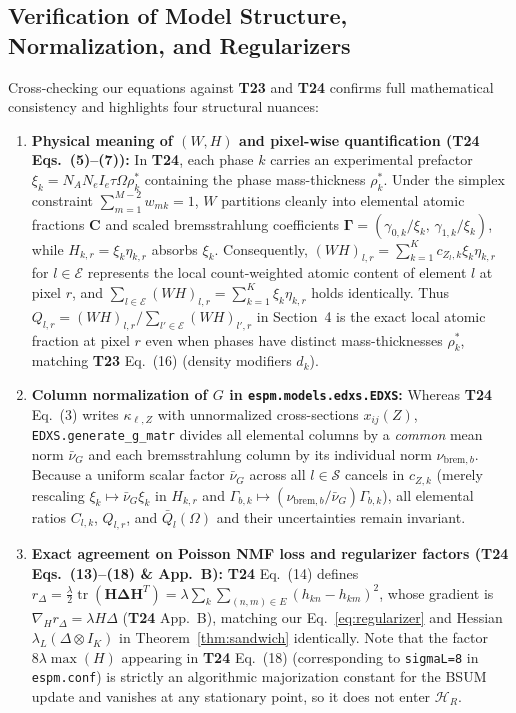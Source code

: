 \documentclass[11pt,a4paper]{article}
\theoremstyle{plain}
\theoremstyle{definition}
\theoremstyle{remark}
\newcommand{\E}{\mathcal{E}}
\newcommand{\cS}{\mathcal{S}}
\newcommand{\cH}{\mathcal{H}}
\newcommand{\tr}{\operatorname{tr}}
\newcommand{\kron}{\otimes}
\begin{document}
\subsection{Verification of Model Structure, Normalization, and Regularizers}
Cross-checking our equations against \textbf{T23} and \textbf{T24} confirms full mathematical consistency and highlights four structural nuances:
\begin{enumerate}[leftmargin=1.5em]
    \item \textbf{Physical meaning of $(W,H)$ and pixel-wise quantification (\textbf{T24} Eqs.~(5)--(7)):} In \textbf{T24}, each phase $k$ carries an experimental prefactor $\xi_k = N_A N_e I_e \tau \Omega \rho_k^*$ containing the phase mass-thickness $\rho_k^*$. Under the simplex constraint $\sum_{m=1}^{M-2} w_{mk} = 1$, $W$ partitions cleanly into elemental atomic fractions $\boldsymbol{C}$ and scaled bremsstrahlung coefficients $\boldsymbol{\Gamma} = (\gamma_{0,k}/\xi_k,\, \gamma_{1,k}/\xi_k)$, while $H_{k,r} = \xi_k \eta_{k,r}$ absorbs $\xi_k$. Consequently, $(WH)_{l,r} = \sum_{k=1}^K c_{Z_l, k} \xi_k \eta_{k,r}$ for $l \in \E$ represents the local count-weighted atomic content of element $l$ at pixel $r$, and $\sum_{l\in\E} (WH)_{l,r} = \sum_{k=1}^K \xi_k \eta_{k,r}$ holds identically. Thus $Q_{l,r} = (WH)_{l,r}/\sum_{l'\in\E} (WH)_{l',r}$ in Section~4 is the exact local atomic fraction at pixel $r$ even when phases have distinct mass-thicknesses $\rho_k^*$, matching \textbf{T23} Eq.~(16) (density modifiers $d_k$).
    \item \textbf{Column normalization of $G$ in \texttt{espm.models.edxs.EDXS}:} Whereas \textbf{T24} Eq.~(3) writes $\kappa_{\ell, Z}$ with unnormalized cross-sections $x_{ij}(Z)$, \texttt{EDXS.generate\_g\_matr} divides all elemental columns by a \emph{common} mean norm $\bar{\nu}_G$ and each bremsstrahlung column by its individual norm $\nu_{\text{brem}, b}$. Because a uniform scalar factor $\bar{\nu}_G$ across all $l \in \cS$ cancels in $c_{Z,k}$ (merely rescaling $\xi_k \mapsto \bar{\nu}_G \xi_k$ in $H_{k,r}$ and $\Gamma_{b,k} \mapsto (\nu_{\text{brem}, b}/\bar{\nu}_G)\Gamma_{b,k}$), all elemental ratios $C_{l,k}$, $Q_{l,r}$, and $\bar{Q}_l(\Omega)$ and their uncertainties remain invariant.
    \item \textbf{Exact agreement on Poisson NMF loss and regularizer factors (\textbf{T24} Eqs.~(13)--(18) \& App.~B):} \textbf{T24} Eq.~(14) defines $r_\Delta = \frac{\lambda}{2}\tr(\boldsymbol{H}\boldsymbol{\Delta}\boldsymbol{H}^T) = \lambda \sum_k \sum_{(n,m)\in E}(h_{kn}-h_{km})^2$, whose gradient is $\nabla_H r_\Delta = \lambda H\Delta$ (\textbf{T24} App.~B), matching our Eq.~\eqref{eq:regularizer} and Hessian $\lambda_L(\Delta \kron I_K)$ in Theorem~\ref{thm:sandwich} identically. Note that the factor $8\lambda\max(H)$ appearing in \textbf{T24} Eq.~(18) (corresponding to \texttt{sigmaL=8} in \texttt{espm.conf}) is strictly an algorithmic majorization constant for the BSUM update and vanishes at any stationary point, so it does not enter $\cH_R$.

\end{enumerate}
\end{document}
